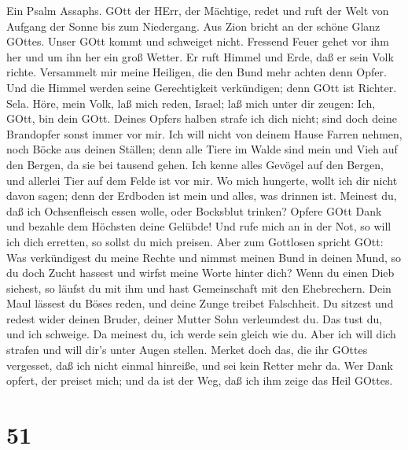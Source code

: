  Ein Psalm Assaphs. GOtt der HErr, der Mächtige, redet und
ruft der Welt von Aufgang der Sonne bis zum Niedergang.  Aus
Zion bricht an der schöne Glanz GOttes.  Unser GOtt kommt
und schweiget nicht. Fressend Feuer gehet vor ihm her und um ihn her ein
groß Wetter.  Er ruft Himmel und Erde, daß er sein Volk
richte.  Versammelt mir meine Heiligen, die den Bund mehr
achten denn Opfer.  Und die Himmel werden seine
Gerechtigkeit verkündigen; denn GOtt ist Richter. Sela. 
Höre, mein Volk, laß mich reden, Israel; laß mich unter dir zeugen: Ich,
GOtt, bin dein GOtt.  Deines Opfers halben strafe ich dich
nicht; sind doch deine Brandopfer sonst immer vor mir.  Ich
will nicht von deinem Hause Farren nehmen, noch Böcke aus deinen
Ställen;  denn alle Tiere im Walde sind mein und Vieh auf
den Bergen, da sie bei tausend gehen.  Ich kenne alles
Gevögel auf den Bergen, und allerlei Tier auf dem Felde ist vor mir.
 Wo mich hungerte, wollt ich dir nicht davon sagen; denn
der Erdboden ist mein und alles, was drinnen ist.  Meinest
du, daß ich Ochsenfleisch essen wolle, oder Bocksblut trinken?
 Opfere GOtt Dank und bezahle dem Höchsten deine Gelübde!
 Und rufe mich an in der Not, so will ich dich erretten, so
sollst du mich preisen.  Aber zum Gottlosen spricht GOtt:
Was verkündigest du meine Rechte und nimmst meinen Bund in deinen Mund,
 so du doch Zucht hassest und wirfst meine Worte hinter
dich?  Wenn du einen Dieb siehest, so läufst du mit ihm und
hast Gemeinschaft mit den Ehebrechern.  Dein Maul lässest
du Böses reden, und deine Zunge treibet Falschheit.  Du
sitzest und redest wider deinen Bruder, deiner Mutter Sohn verleumdest
du.  Das tust du, und ich schweige. Da meinest du, ich
werde sein gleich wie du. Aber ich will dich strafen und will dir's
unter Augen stellen.  Merket doch das, die ihr GOttes
vergesset, daß ich nicht einmal hinreiße, und sei kein Retter mehr da.
 Wer Dank opfert, der preiset mich; und da ist der Weg, daß
ich ihm zeige das Heil GOttes.

\hypertarget{section-50}{%
\section{51}\label{section-50}}

